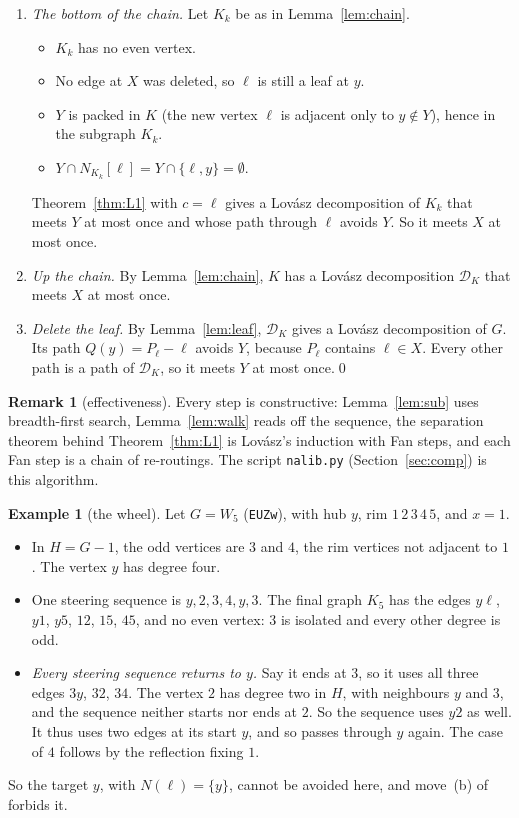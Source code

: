 \documentclass[11pt]{amsart}
\theoremstyle{definition}
\newtheorem{remark}[theorem]{Remark}
\newtheorem{example}[theorem]{Example}
\newcommand{\cD}{\mathcal D}
\begin{document}
\begin{enumerate}[label=(\alph*)]
\item \emph{The bottom of the chain.} Let $K_k$ be as in Lemma~\ref{lem:chain}.
  \begin{itemize}
  \item $K_k$ has no even vertex.
  \item No edge at $X$ was deleted, so $\ell$ is still a leaf at $y$.
  \item $Y$ is packed in $K$ (the new vertex $\ell$ is adjacent only to $y\notin Y$), hence in the
  subgraph $K_k$.
  \item $Y\cap N_{K_k}[\ell]=Y\cap\{\ell,y\}=\emptyset$.
  \end{itemize}
  Theorem~\ref{thm:L1} with $c=\ell$ gives a Lov\'asz decomposition of $K_k$ that meets $Y$ at most once
  and whose path through $\ell$ avoids $Y$. So it meets $X$ at most once.
\item \emph{Up the chain.} By Lemma~\ref{lem:chain}, $K$ has a Lov\'asz decomposition $\cD_K$ that
meets $X$ at most once.
\item \emph{Delete the leaf.} By Lemma~\ref{lem:leaf}, $\cD_K$ gives a Lov\'asz decomposition of $G$.
Its path $Q(y)=P_\ell-\ell$ avoids $Y$, because $P_\ell$ contains $\ell\in X$. Every other path is a path of
$\cD_K$, so it meets $Y$ at most once.\qed
\end{enumerate}

\begin{remark}[effectiveness]\label{rem:eff}
Every step is constructive: Lemma~\ref{lem:sub} uses breadth-first search, Lemma~\ref{lem:walk}
reads off the sequence, the separation theorem behind Theorem~\ref{thm:L1} is Lov\'asz's induction
with Fan steps, and each Fan step is a chain of re-routings. The script \texttt{nalib.py}
(Section~\ref{sec:comp}) is this algorithm.
\end{remark}

\begin{example}[the wheel]\label{ex:wheel}
Let $G=W_5$ (\texttt{EUZw}), with hub $y$, rim $1\,2\,3\,4\,5$, and $x=1$.
\begin{itemize}
\item In $H=G-1$, the odd vertices are $3$ and $4$, the rim vertices not adjacent to $1$. The vertex
$y$ has degree four.
\item One steering sequence is $y,2,3,4,y,3$. The final graph $K_5$ has the edges $y\ell$, $y1$,
$y5$, $12$, $15$, $45$, and no even vertex: $3$ is isolated and every other degree is odd.
\item \emph{Every steering sequence returns to $y$.} Say it ends at $3$, so it uses all three edges
$3y$, $32$, $34$. The vertex $2$ has degree two in $H$, with neighbours $y$ and $3$, and the sequence
neither starts nor ends at $2$. So the sequence uses $y2$ as well. It thus uses two edges at its
start $y$, and so passes through $y$ again. The case of $4$ follows by the reflection fixing $1$.
\end{itemize}
So the target $y$, with $N(\ell)=\{y\}$, cannot be avoided here, and move~(b) of~\cite{CN,L1I}
forbids it.
\end{example}
\end{document}
